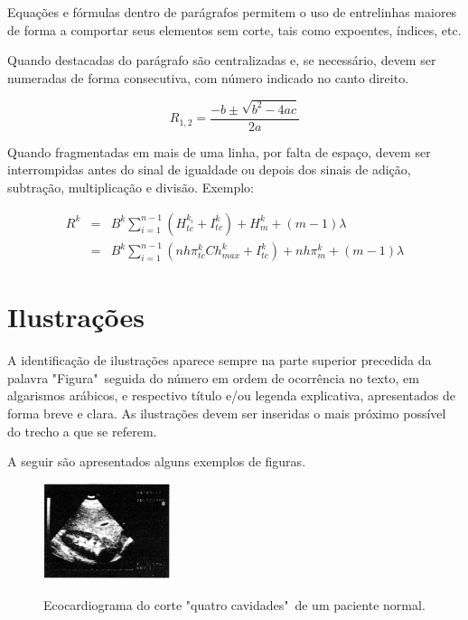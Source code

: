 \documentclass[repeatfields,xlists,xpacks,oneside,yearsonly]{ufrgscca}
\begin{document}
\begin{appendix}
Equações e fórmulas dentro de parágrafos permitem o uso de entrelinhas
maiores de forma a comportar seus elementos sem corte, tais como expoentes,
índices, etc.

Quando destacadas do parágrafo são centralizadas e, se necessário, devem ser
numeradas de forma consecutiva, com número indicado no canto direito.

\begin{equation}
R_{1,2}=\frac{-b\pm\sqrt{b^2-4ac}}{2a}
\end{equation}

Quando fragmentadas em mais de uma linha, por falta de espaço, devem ser
interrompidas antes do sinal de igualdade ou depois dos sinais de adição,
subtração, multiplicação e divisão. Exemplo:

\begin{eqnarray}
R^k &=& B^k \sum_{i=1}^{n-1}{\left(H_{tc}^{k_i}+I_{tc}^k\right)}+H_m^k+(m-1)\lambda \nonumber\\
&=& B^k \sum_{i=1}^{n-1}{\left(nh\pi_{tc}^kCh_{max}^k+I_{tc}^k\right)}+nh\pi_m^k+(m-1)\lambda
\end{eqnarray}


\section{Ilustrações}

A identificação de ilustrações aparece sempre na parte superior precedida da
palavra "Figura"\ seguida do número em ordem de ocorrência no texto, em
algarismos arábicos, e respectivo título e/ou legenda explicativa,
apresentados de forma breve e clara. As ilustrações devem ser inseridas o
mais próximo possível do trecho a que se referem.

A seguir são apresentados alguns exemplos de figuras.

\begin{figure}[htbp]
{
  \centering
  \caption{Ecocardiograma do corte "quatro cavidades"\ de um paciente normal.}
  \includegraphics[width=0.33\textwidth]{eco}\\
}
{}
\end{figure}


\end{appendix}
\end{document}
